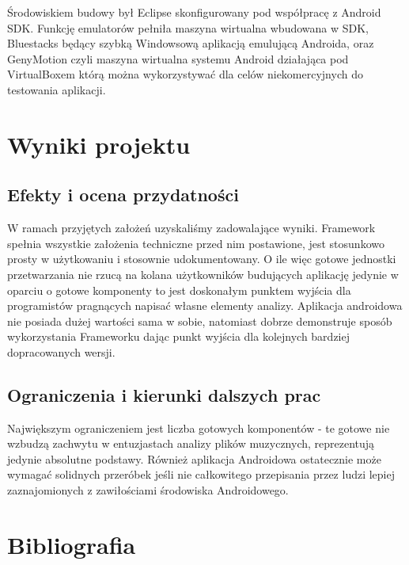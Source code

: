 Środowiskiem budowy był Eclipse skonfigurowany pod współpracę z Android SDK. Funkcję emulatorów pełniła maszyna wirtualna wbudowana w SDK, Bluestacks będący szybką Windowsową aplikacją emulującą Androida, oraz GenyMotion czyli maszyna wirtualna systemu Android działająca pod VirtualBoxem którą można wykorzystywać dla celów niekomercyjnych do testowania aplikacji.

\chapter{Wyniki projektu}
\section{Efekty i ocena przydatności}
W ramach przyjętych założeń uzyskaliśmy zadowalające wyniki. Framework spełnia wszystkie założenia techniczne przed nim postawione, jest stosunkowo prosty w użytkowaniu i stosownie udokumentowany. O ile więc gotowe jednostki przetwarzania nie rzucą na kolana użytkowników budujących aplikację jedynie w oparciu o gotowe komponenty to jest doskonałym punktem wyjścia dla programistów pragnących napisać własne elementy analizy. Aplikacja androidowa nie posiada dużej wartości sama w sobie, natomiast dobrze demonstruje sposób wykorzystania Frameworku dając punkt wyjścia dla kolejnych bardziej dopracowanych wersji.

\section{Ograniczenia i kierunki dalszych prac}
Największym ograniczeniem jest liczba gotowych komponentów - te gotowe nie wzbudzą zachwytu w entuzjastach analizy plików muzycznych, reprezentują jedynie absolutne podstawy. Również aplikacja Androidowa ostatecznie może wymagać solidnych przeróbek jeśli nie całkowitego przepisania przez ludzi lepiej zaznajomionych z zawiłościami środowiska Androidowego.

\chapter{Bibliografia}

